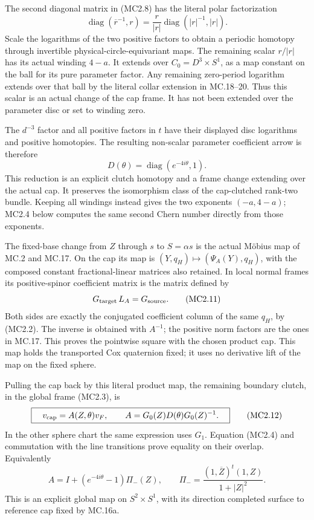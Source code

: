 The second diagonal matrix in (MC2.8) has the literal polar
factorization
\[
 \operatorname{diag}(\overline r^{-1},r)
 =\frac r{|r|}
       \operatorname{diag}(|r|^{-1},|r|).                \tag{MC2.9}
\]
Scale the logarithms of the two positive factors to obtain a periodic
homotopy through invertible physical-circle-equivariant maps. The
remaining scalar \(r/|r|\) has its actual winding \(4-a\). It extends
over \(C_0=D^3\times S^1\), as a map constant on the ball for its
pure parameter factor. Any remaining zero-period logarithm extends
over that ball by the literal collar extension in MC.18--20.
Thus this scalar is an actual change of the cap frame. It has not
been extended over the parameter disc or set to winding zero.

The \(d^{-3}\) factor and all positive factors in \(t\) have their
displayed disc logarithms and positive homotopies. The resulting
non-scalar parameter coefficient arrow is therefore
\[
             D(\theta)=\operatorname{diag}(e^{-4i\theta},1).
                                                               \tag{MC2.10}
\]
This reduction is an explicit clutch homotopy and a frame change
extending over the actual cap. It preserves the isomorphism class
of the cap-clutched rank-two bundle. Keeping all windings instead
gives the two exponents \((-a,4-a)\); MC2.4 below computes the same
second Chern number directly from those exponents.

The fixed-base change from \(Z\) through \(s\) to \(S=\alpha s\)
is the actual Möbius map of MC.2 and MC.17. On the cap its map is
\((Y,q_H)\mapsto(\Psi_A(Y),q_H)\), with the composed constant
fractional-linear matrices also retained. In local normal frames
its positive-spinor coefficient matrix is the matrix defined by
\[
                    G_{\rm target}\,L_A=G_{\rm source}. \tag{MC2.11}
\]
Both sides are exactly the conjugated coefficient column of the
same \(q_H\), by (MC2.2). The inverse is obtained with \(A^{-1}\);
the positive norm factors are the ones in MC.17. This proves the
pointwise square with the chosen product cap. This map holds the
transported Cox quaternion fixed; it uses no derivative lift of
the map on the fixed sphere.

Pulling the cap back by this literal product map, the remaining
boundary clutch, in the global frame (MC2.3), is
\[
 \boxed{\quad v_{\rm cap}
       =A(Z,\theta)v_F,\qquad
 A=G_0(Z)D(\theta)G_0(Z)^{-1}.\quad}                    \tag{MC2.12}
\]
In the other sphere chart the same expression uses \(G_1\).
Equation (MC2.4) and commutation with the line transitions prove
equality on their overlap. Equivalently
\[
 A=I+(e^{-4i\theta}-1)\Pi_-(Z),\qquad
 \Pi_-=\frac{(1,\overline Z)^t(1,Z)}{1+|Z|^2}.          \tag{MC2.13}
\]
This is an explicit global map on \(S^2\times S^1\), with its
direction completed surface to reference cap fixed by MC.16a.

